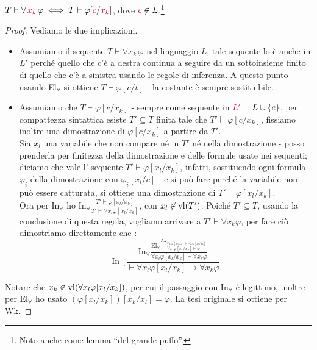 \begin{lemma}
    $T \vdash \forall \,\textcolor{purple}{x_k}\, \varphi \iff T \vdash \varphi[\textcolor{purple}{c}/\textcolor{purple}{x_k}]$, dove $\textcolor{purple}{c}\not\in L$.\footnote{Noto anche come lemma ``del grande puffo''.}
\end{lemma}

\begin{proof}
    Vediamo le due implicazioni.
    \begin{itemize}
        \item[$\boxed{\implies}$] Assumiamo il sequente $T \vdash \forall x_k\,\varphi$ nel linguaggio $L$, tale sequente lo è anche in $L'$ perché quello che c'è a destra continua a seguire da un sottoinsieme finito di quello che c'è a sinistra usando le regole di inferenza.
        A questo punto usando El$_\forall$ si ottiene $T \vdash \varphi[c/t]$ - la costante è sempre sostituibile.
        \item[$\boxed{\impliedby}$] Assumiamo che $T \vdash \varphi[c/x_k]$ - sempre come sequente in $\textcolor{purple}{L'} = L \cup \{c\}$, per compattezza sintattica esiste $T' \subseteq T$ finita tale che $T' \vdash \varphi[c/x_k]$,
        fissiamo inoltre una dimostrazione di $\varphi[c/x_k]$ a partire da $T'$.\\
        Sia $x_l$ una variabile che non compare né in $T'$ né nella dimostrazione - posso prenderla per finitezza della dimostrazione e delle formule usate nei sequenti;
        diciamo che vale l'-sequente $T' \vdash \varphi[x_l/x_k]$, infatti, sostituendo ogni formula $\varphi_i$ della dimostrazione con $\varphi_i[x_l/c]$ - e si può fare perché la variabile non può essere catturata, si ottiene una dimostrazione di $T'\vdash\varphi[x_l/x_k]$.\\
        Ora per In$_\forall$ ho $\displaystyle\text{In}_\forall\frac{T' \vdash \varphi[x_l/x_k]}{T' \vdash \forall x_l \varphi[x_l/x_k]}$, con $x_l \not\in \operatorname{vl}(T')$. Poiché $T' \subseteq T$, usando la conclusione di questa regola, vogliamo arrivare a $T' \vdash \forall x_k \varphi$, per fare ciò dimostriamo direttamente che :
        \[ \text{In}_\to\frac{\displaystyle \text{In}_\forall\frac{\displaystyle \text{El}_\forall\frac{\displaystyle\text{Ax}\frac{}{\forall x_l \varphi[x_l/x_k]\vdash \forall x_l \varphi[x_l/x_k]}}{\forall x_l \varphi[x_l/x_k] \vdash \varphi}}{\forall x_l \varphi[x_l/x_k] \vdash \forall x_k \varphi}}{\vdash \forall x_l \varphi[x_l/x_k] \to \forall x_k \varphi} \]
    \end{itemize}
    Notare che $x_k \not\in \operatorname{vl}(\forall x_l \varphi[x_l/x_k])$, per cui il passaggio con In$_\forall$ è legittimo, inoltre per El$_\forall$ ho usato $(\varphi[x_l/x_k])[x_k/x_l] = \varphi$. La tesi originale si ottiene per Wk.
\end{proof}

